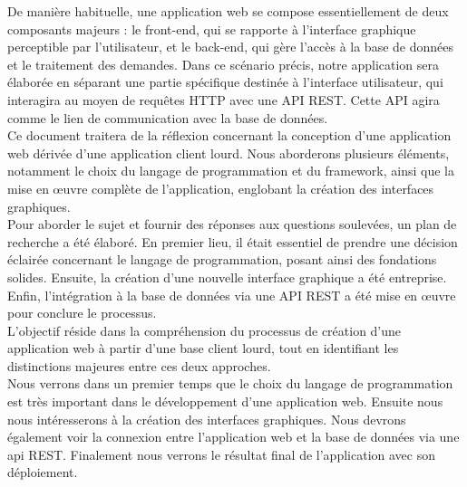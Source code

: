 \documentclass[a4paper, 12pt, french]{article}
\begin{document}
		De manière habituelle, une application web se compose essentiellement de deux composants majeurs : le front-end, qui se rapporte à l'interface graphique perceptible par l'utilisateur, et le back-end, qui gère l'accès à la base de données et le traitement des demandes. Dans ce scénario précis, notre application sera élaborée en séparant une partie spécifique destinée à l'interface utilisateur, qui interagira au moyen de requêtes HTTP avec une API REST. Cette API agira comme le lien de communication avec la base de données.\\
		
		Ce document traitera de la réflexion concernant la conception d'une application web dérivée d'une application client lourd. Nous aborderons plusieurs éléments, notamment le choix du langage de programmation et du framework, ainsi que la mise en œuvre complète de l'application, englobant la création des interfaces graphiques.\\
		
		Pour aborder le sujet et fournir des réponses aux questions soulevées, un plan de recherche a été élaboré. En premier lieu, il était essentiel de prendre une décision éclairée concernant le langage de programmation, posant ainsi des fondations solides. Ensuite, la création d'une nouvelle interface graphique a été entreprise. Enfin, l'intégration à la base de données via une API REST a été mise en œuvre pour conclure le processus.\\
		
		L'objectif réside dans la compréhension du processus de création d'une application web à partir d'une base client lourd, tout en identifiant les distinctions majeures entre ces deux approches.\\
		
		Nous verrons dans un premier temps que le choix du langage de programmation est très important dans le développement d’une application web. Ensuite nous nous intéresserons à la création des interfaces graphiques. Nous devrons également voir la connexion entre l’application web et la base de données via une api REST. Finalement nous verrons le résultat final de l’application avec son déploiement.

	\newpage

	
\end{document}
